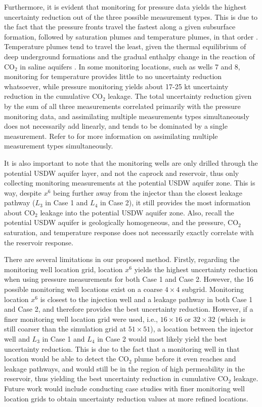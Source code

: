 \documentclass[a4paper,fleqn]{cas-sc}
\begin{document}
Furthermore, it is evident that monitoring for pressure data yields the highest uncertainty reduction out of the three possible measurement types. This is due to the fact that the pressure fronts travel the fastest along a given subsurface formation, followed by saturation plumes and temperature plumes, in that order \citep{Chadwick2006303}. Temperature plumes tend to travel the least, given the thermal equilibrium of deep underground formations and the gradual enthalpy change in the reaction of CO$_2$ in saline aquifers \citep{koschel2006enthalpy}. In some monitoring locations, such as wells 7 and 8, monitoring for temperature provides little to no uncertainty reduction whatsoever, while pressure monitoring yields about 17-25 kt uncertainty reduction in the cumulative CO$_2$ leakage. The total uncertainty reduction given by the sum of all three measurements correlated primarily with the pressure monitoring data, and assimilating multiple measurements types simultaneously does not necessarily add linearly, and tends to be dominated by a single measurement. Refer to \citet{Chen2018} for more information on assimilating multiple measurement types simultaneously.

It is also important to note that the monitoring wells are only drilled through the potential USDW aquifer layer, and not the caprock and reservoir, thus only collecting monitoring measurements at the potential USDW aquifer zone. This is way, despite $x^6$ being further away from the injector than the closest leakage pathway ($L_3$ in Case 1 and $L_4$ in Case 2), it still provides the most information about CO$_2$ leakage into the potential USDW aquifer zone. Also, recall the potential USDW aquifer is geologically homogeneous, and the pressure, CO$_2$ saturation, and temperature response does not necessarily exactly correlate with the reservoir response.

There are several limitations in our proposed method. Firstly, regarding the monitoring well location grid, location $x^6$ yields the highest uncertainty reduction when using pressure measurements for both Case 1 and Case 2. However, the 16 possible monitoring well locations exist on a coarse $4\times 4$ subgrid. Monitoring location $x^6$ is closest to the injection well and a leakage pathway in both Case 1 and Case 2, and therefore provides the best uncertainty reduction. However, if a finer monitoring well location grid were used, i.e., $16 \times 16$ or $32 \times 32$ (which is still coarser than the simulation grid at $51 \times 51$), a location between the injector well and $L_3$ in Case 1 and $L_4$ in Case 2 would most likely yield the best uncertainty reduction. This is due to the fact that a monitoring well in that location would be able to detect the CO$_2$ plume before it even reaches and leakage pathways, and would still be in the region of high permeability in the reservoir, thus yielding the best uncertainty reduction in cumulative CO$_2$ leakage. Future work would include conducting case studies with finer monitoring well location grids to obtain uncertainty reduction values at more refined locations.
\end{document}
